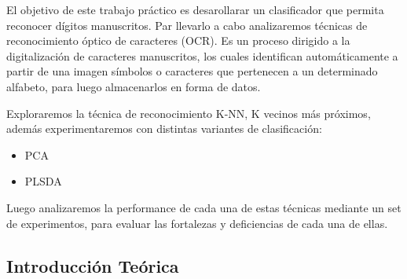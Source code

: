 El objetivo de este trabajo práctico es desarollarar un clasificador que permita reconocer dígitos manuscritos.
Par llevarlo a cabo analizaremos técnicas de reconocimiento óptico de caracteres (OCR). Es un proceso dirigido a la digitalización de caracteres manuscritos, los cuales identifican automáticamente a partir de una imagen símbolos o caracteres que pertenecen a un determinado alfabeto, para luego almacenarlos en forma de datos.

Exploraremos la técnica de reconocimiento K-NN, K vecinos más próximos, además experimentaremos con distintas variantes de clasificación:

\begin{itemize}
\item PCA
\item PLSDA
\end{itemize}


Luego analizaremos la performance de cada una de estas técnicas mediante un set de experimentos, para evaluar las fortalezas y deficiencias de cada una de ellas. \\


\subsection{Introducción Teórica}







